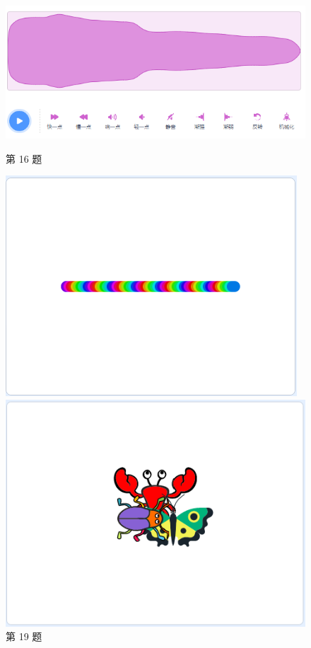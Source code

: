 \documentclass[10pt, a4paper]{article}
\begin{document}
\begin{enumerate}
        \begin{figure}[htbp]
            \centering
            \begin{minipage}[t]{.4\textwidth}
                \centering
                \includegraphics[width=\textwidth]{16.png}
                \caption*{第 16 题}
            \end{minipage}
            \begin{minipage}[t]{.22\textwidth}
                \centering
                \includegraphics[width=\textwidth]{19.png}
                \caption*{第 19 题}
            \end{minipage}
            \begin{minipage}[t]{.22\textwidth}
                \centering
                \includegraphics[width=\textwidth]{20.png}

\end{minipage}
\end{figure}
\end{enumerate}
\end{document}
